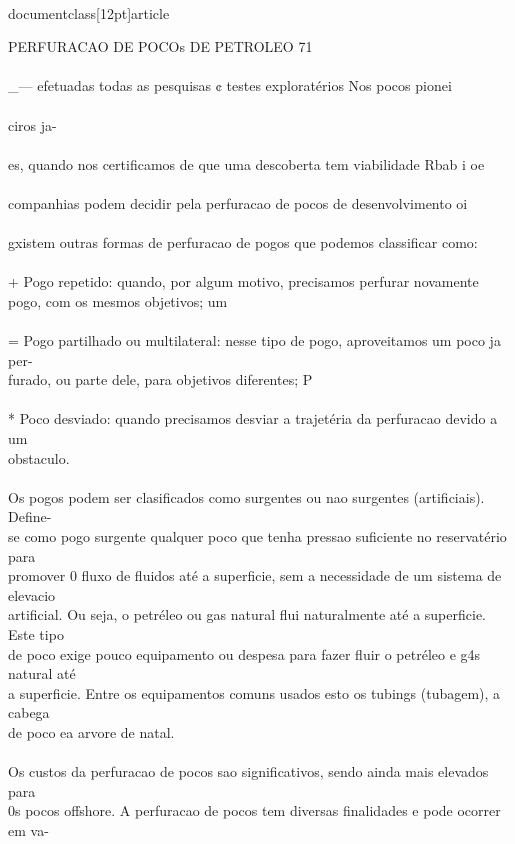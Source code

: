 \\documentclass[12pt]{article}
\begin{document}
{PERFURACAO DE POCOs DE PETROLEO 71\\
\\_— efetuadas todas as pesquisas ¢ testes exploratérios Nos pocos pionei\\
\\
ciros ja-\\
\\
es, quando nos certificamos de que uma descoberta tem viabilidade Rbab i oe\\
\\
companhias podem decidir pela perfuracao de pocos de desenvolvimento oi\\
\\
gxistem outras formas de perfuracao de pogos que podemos classificar como:\\
\\
+ Pogo repetido: quando, por algum motivo, precisamos perfurar novamente\\
pogo, com os mesmos objetivos; um\\
\\
= Pogo partilhado ou multilateral: nesse tipo de pogo, aproveitamos um poco ja per-\\
furado, ou parte dele, para objetivos diferentes; P\\
\\
* Poco desviado: quando precisamos desviar a trajetéria da perfuracao devido a um\\
obstaculo.\\
\\
Os pogos podem ser clasificados como surgentes ou nao surgentes (artificiais). Define-\\
se como pogo surgente qualquer poco que tenha pressao suficiente no reservatério para\\
promover 0 fluxo de fluidos até a superficie, sem a necessidade de um sistema de elevacio\\
artificial. Ou seja, o petréleo ou gas natural flui naturalmente até a superficie. Este tipo\\
de poco exige pouco equipamento ou despesa para fazer fluir o petréleo e g4s natural até\\
a superficie. Entre os equipamentos comuns usados esto os tubings (tubagem), a cabega\\
de poco ea arvore de natal.\\
\\
Os custos da perfuracao de pocos sao significativos, sendo ainda mais elevados para\\
0s pocos offshore. A perfuracao de pocos tem diversas finalidades e pode ocorrer em va-\\
}
\end{document}
